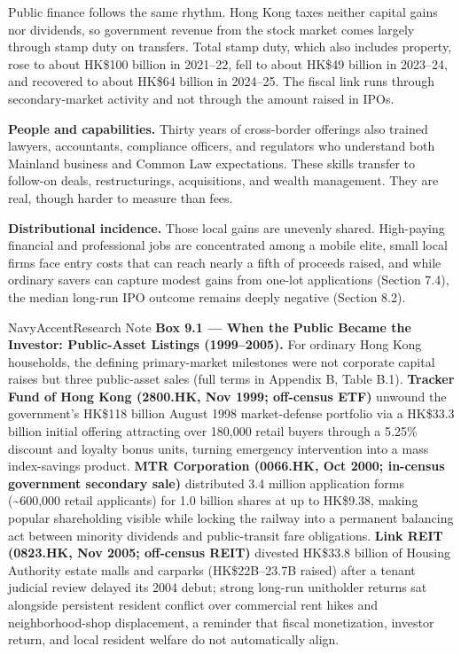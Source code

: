 \documentclass[11pt,letterpaper]{article}
\begin{document}
Public finance follows the same rhythm. Hong Kong taxes neither capital gains nor dividends, so government revenue from the stock market comes largely through stamp duty on transfers. Total stamp duty, which also includes property, rose to about HK\$100 billion in 2021–22, fell to about HK\$49 billion in 2023–24, and recovered to about HK\$64 billion in 2024–25. The fiscal link runs through secondary-market activity and not through the amount raised in IPOs.

\textbf{People and capabilities.} Thirty years of cross-border offerings also trained lawyers, accountants, compliance officers, and regulators who understand both Mainland business and Common Law expectations. These skills transfer to follow-on deals, restructurings, acquisitions, and wealth management. They are real, though harder to measure than fees.

\textbf{Distributional incidence.} Those local gains are unevenly shared. High-paying financial and professional jobs are concentrated among a mobile elite, small local firms face entry costs that can reach nearly a fifth of proceeds raised, and while ordinary savers can capture modest gains from one-lot applications (Section 7.4), the median long-run IPO outcome remains deeply negative (Section 8.2).

\begin{calloutbox}{NavyAccent}{Research Note}
\textbf{Box 9.1 — When the Public Became the Investor: Public-Asset Listings (1999–2005).} For ordinary Hong Kong households, the defining primary-market milestones were not corporate capital raises but three public-asset sales (full terms in Appendix B, Table B.1). \textbf{Tracker Fund of Hong Kong (2800.HK, Nov 1999; off-census ETF)} unwound the government's HK\$118 billion August 1998 market-defense portfolio via a HK\$33.3 billion initial offering attracting over 180,000 retail buyers through a 5.25\% discount and loyalty bonus units, turning emergency intervention into a mass index-savings product. \textbf{MTR Corporation (0066.HK, Oct 2000; in-census government secondary sale)} distributed 3.4 million application forms (\textasciitilde{}600,000 retail applicants) for 1.0 billion shares at up to HK\$9.38, making popular shareholding visible while locking the railway into a permanent balancing act between minority dividends and public-transit fare obligations. \textbf{Link REIT (0823.HK, Nov 2005; off-census REIT)} divested HK\$33.8 billion of Housing Authority estate malls and carparks (HK\$22B–23.7B raised) after a tenant judicial review delayed its 2004 debut; strong long-run unitholder returns sat alongside persistent resident conflict over commercial rent hikes and neighborhood-shop displacement, a reminder that fiscal monetization, investor return, and local resident welfare do not automatically align.
\end{calloutbox}
\end{document}
